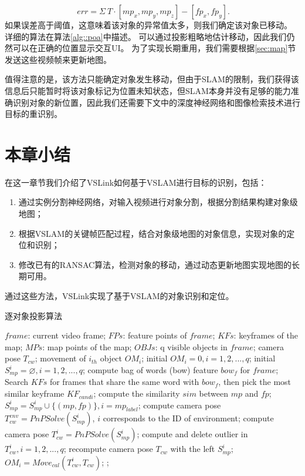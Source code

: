 \begin{equation}\label{equ:gdt}
\
err = \Sigma \ T \cdot [mp_x, mp_y, mp_z] - [fp_x, fp_y].
\end{equation}
如果误差高于阈值，这意味着该对象的异常值太多，则我们确定该对象已移动。
详细的算法在算法\ref{alg::poa}中描述。
可以通过投影粗略地估计移动，因此我们仍然可以在正确的位置显示交互UI。
为了实现长期重用，我们需要根据\ref{sec:map}节发送这些视频帧来更新地图。

值得注意的是，该方法只能确定对象发生移动，但由于SLAM的限制，我们获得该信息后只能暂时将该对象标记为位置未知状态，但SLAM本身并没有足够的能力准确识别对象的新位置，因此我们还需要下文中的深度神经网络和图像检索技术进行目标的重识别。

\section{本章小结}
在这一章节我们介绍了VSLink如何基于VSLAM进行目标的识别，包括：
\begin{enumerate}
	\item 通过实例分割神经网络，对输入视频进行对象分割，根据分割结果构建对象级地图；
	\item 根据VSLAM的关键帧匹配过程，结合对象级地图的对象信息，实现对象的定位和识别；
	\item 修改已有的RANSAC算法，检测对象的移动，通过动态更新地图实现地图的长期可用。
\end{enumerate}
通过这些方法，VSLink实现了基于VSLAM的对象识别和定位。

\begin{algorithm}[htb]  
	\caption{逐对象投影算法}  
	\label{alg::poa}  
	\begin{algorithmic}[1]  
		\Require  
		$frame$: current video frame;
		$FPs$: feature points of $frame$;  
		$KFs$: keyframes of the map;  
		$MPs$: map points of the map;
		$OBJs$: q visible objects in $frame$;   
		\Ensure  
		camera pose $T_{cw}$;
		movement of $i_{th}$ object $OM_i$;
		\State initial $OM_i=0, i = 1,2,...,q$;
		\State initial $S_{mp}^i=\varnothing, i=1,2,...,q$;
		\State compute bag of words (bow) feature $bow_f$ for $frame$;
		\State Search $KFs$ for frames that share the same word with $bow_f$, then pick the most similar keyframe $KF_{candi}$;
		\For{each $mp\in KF_{candi}$}
		compute the similarity $sim$ between $mp$ and $fp$;
		\State $S_{mp}^i = S_{mp}^i\cup\{(mp,fp)\}, i = mp_{label}$;
		\EndIf
		\EndFor 
		\EndFor
		\State compute camera pose $T_{cw}^{env} = PnPSolve(S_{mp}^i)$, $i$ corresponds to the ID of environment;
		\For{each $obj\in OBJs$}
		\State compute camera pose $T_{cw}^{i} = PnPSolve(S_{mp}^i)$;
		\EndFor
		\EndFor
		\State compute and delete outlier in ${T_{cw}^{i}, i=1,2,...,q}$;
		\State recompute camera pose $T_{cw}$ with the left $S_{mp}^i$;
		\State $OM_i = Move_{cal}(T_{cw}^{i}, T_{cw})$; 
		\Else 
		;
		\EndIf
	\end{algorithmic}
\end{algorithm}  



